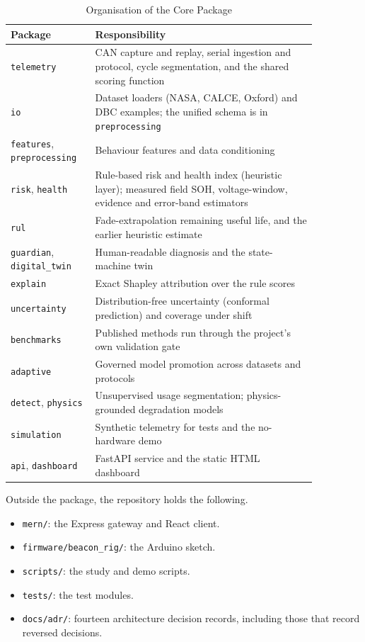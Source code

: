 \begin{table}[htbp]
	\caption{Organisation of the Core Package}
	\centering
	\small
	\renewcommand{\arraystretch}{1.15}
	\setlength{\tabcolsep}{4pt}
	\begin{tabular}{|L{0.22\linewidth}|L{0.64\linewidth}|}
		\hline
		\textbf{Package} & \textbf{Responsibility} \\
		\hline
		\texttt{telemetry} & CAN capture and replay, serial ingestion and protocol, cycle segmentation, and the shared scoring function \\
		\hline
		\texttt{io} & Dataset loaders (NASA, CALCE, Oxford) and DBC examples; the unified schema is in \texttt{preprocessing} \\
		\hline
		\texttt{features}, \texttt{preprocessing} & Behaviour features and data conditioning \\
		\hline
		\texttt{risk}, \texttt{health} & Rule-based risk and health index (heuristic layer); measured field SOH, voltage-window, evidence and error-band estimators \\
		\hline
		\texttt{rul} & Fade-extrapolation remaining useful life, and the earlier heuristic estimate \\
		\hline
		\texttt{guardian}, \texttt{digital\_twin} & Human-readable diagnosis and the state-machine twin \\
		\hline
		\texttt{explain} & Exact Shapley attribution over the rule scores \\
		\hline
		\texttt{uncertainty} & Distribution-free uncertainty (conformal prediction) and coverage under shift \\
		\hline
		\texttt{benchmarks} & Published methods run through the project's own validation gate \\
		\hline
		\texttt{adaptive} & Governed model promotion across datasets and protocols \\
		\hline
		\texttt{detect}, \texttt{physics} & Unsupervised usage segmentation; physics-grounded degradation models \\
		\hline
		\texttt{simulation} & Synthetic telemetry for tests and the no-hardware demo \\
		\hline
		\texttt{api}, \texttt{dashboard} & FastAPI service and the static HTML dashboard \\
		\hline
	\end{tabular}
	\label{tab:packages}
\end{table}

Outside the package, the repository holds the following.
\begin{itemize}
	\item \texttt{mern/}: the Express gateway and React client.
	\item \texttt{firmware/beacon\_rig/}: the Arduino sketch.
	\item \texttt{scripts/}: the study and demo scripts.
	\item \texttt{tests/}: the test modules.
	\item \texttt{docs/adr/}: fourteen architecture decision records, including those that record reversed decisions.
\end{itemize}


